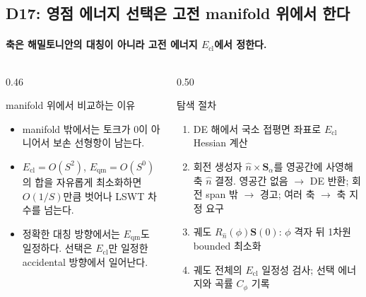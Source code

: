 \subsection{D17: 영점 에너지 선택은 고전 manifold 위에서 한다}\label{state-selection-rule}
\begingroup%
  \framesubtitle{축은 해밀토니안의 대칭이 아니라 고전 에너지 $E_{\mathrm{cl}}$에서 정한다.}
  \begin{columns}[T,onlytextwidth]
    \begin{column}{0.46\textwidth}
      \begin{block}{manifold 위에서 비교하는 이유}
        \small
        \begin{itemize}
          \item manifold 밖에서는 토크가 0이 아니어서 보손 선형항이 남는다.
          \item $E_{\mathrm{cl}}=O(S^2)$, $E_{\mathrm{qm}}=O(S^0)$의 합을 자유롭게 최소화하면
            $O(1/S)$만큼 벗어나 LSWT 차수를 넘는다.
          \item 정확한 대칭 방향에서는 $E_{\mathrm{qm}}$도 일정하다.
            선택은 $E_{\mathrm{cl}}$만 일정한 accidental 방향에서 일어난다.
        \end{itemize}
      \end{block}
    \end{column}
    \begin{column}{0.50\textwidth}
      \begin{block}{탐색 절차}
        \small
        \begin{enumerate}
          \item DE 해에서 국소 접평면 좌표로 $E_{\mathrm{cl}}$ Hessian 계산
          \item 회전 생성자 $\hat n\times\mathbf S_\alpha$를 영공간에 사영해 축 $\hat n$ 결정.
            영공간 없음 $\to$ DE 반환; 회전 span 밖 $\to$ 경고;
            여러 축 $\to$ 축 지정 요구
          \item 궤도 $R_{\hat n}(\phi)\mathbf S(0)$: $\phi$ 격자 뒤 1차원 bounded 최소화
          \item 궤도 전체의 $E_{\mathrm{cl}}$ 일정성 검사; 선택 에너지와 곡률 $C_\phi$ 기록
        \end{enumerate}
      \end{block}
    \end{column}
  \end{columns}
  \par\medskip
\endgroup


